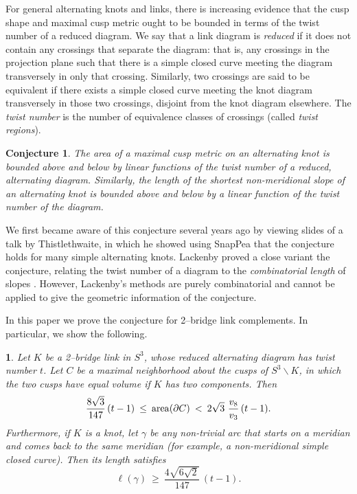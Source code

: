\documentclass[11pt]{amsart}
\renewcommand{\setminus}{{\smallsetminus}}
\newcommand{\area}{{\rm area}}
\newcommand{\bdy}{{\partial}}
\theoremstyle{plain}
\newtheorem{conjecture}[theorem]{Conjecture}
\newtheorem*{namedtheorem}{\theoremname}
\newcommand{\theoremname}{testing}
\newenvironment{named}[1]{\renewcommand{\theoremname}{#1}\begin{namedtheorem}}{\end{namedtheorem}}
\theoremstyle{definition}
\begin{document}
For general alternating knots and links, there is increasing evidence
that the cusp shape and maximal cusp metric ought to be bounded in
terms of the twist number of a reduced diagram. We say that a link
diagram is \emph{reduced} if it does not contain any crossings that
separate the diagram: that is, any crossings in the projection plane
such that there is a simple closed curve meeting the diagram
transversely in only that crossing.  Similarly, two crossings are said
to be equivalent if there exists a simple closed curve meeting the
knot diagram transversely in those two crossings, disjoint from the
knot diagram elsewhere.  The \emph{twist number} is the number of
equivalence classes of crossings (called \emph{twist regions}).

\begin{conjecture}
The area of a maximal cusp metric on an alternating knot is bounded
above and below by linear functions of the twist number of a reduced,
alternating diagram.  Similarly, the length of the shortest
non-meridional slope of an alternating knot is bounded above and below
by a linear function of the twist number of the diagram.
\label{conj:alt-knot-cusp}
\end{conjecture}

We first became aware of this conjecture several years ago by viewing
slides of a talk by Thistlethwaite, in which he showed using SnapPea
that the conjecture holds for many simple alternating knots.  Lackenby
proved a close variant the conjecture, relating the twist number of a
diagram to the \emph{combinatorial length} of slopes
\cite{lackenby:word}.  However, Lackenby's methods are purely
combinatorial and cannot be applied to give the geometric information
of the conjecture.

In this paper we prove the conjecture for 2--bridge link complements.
In particular, we show the following.

\begin{named}{Theorem \ref{thm:2bridge}}
Let $K$ be a 2--bridge link in $S^3$, whose reduced alternating
diagram has twist number $t$.
Let $C$ be a maximal neighborhood about the cusps of $S^3 \setminus
K$, in which the two cusps have equal volume if $K$ has two
components.  Then
$$\frac{8\sqrt{3}}{147}\,(t-1) \: \leq \: \area(\bdy C) \:
<\: 2\sqrt{3}\,\, \frac{v_8}{v_3}\,(t-1).$$
Furthermore, if $K$ is a knot, let $\gamma$ be any non-trivial arc
that starts on a meridian and comes back to the same meridian (for
example, a non-meridional simple closed curve). Then its length
satisfies
$$\ell(\gamma) \: \geq \: \frac{4\sqrt{6\sqrt{2}}}{147}\, (t-1).$$
\end{named}
\end{document}
